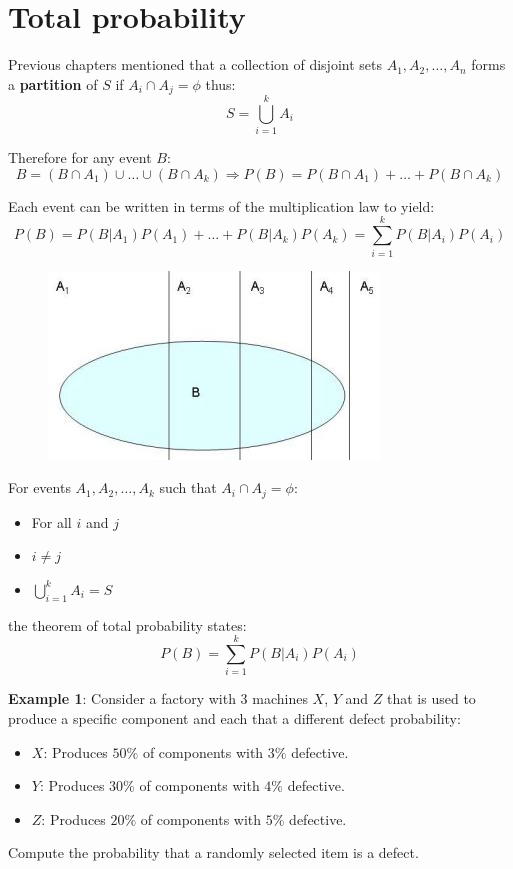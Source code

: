 \documentclass[10pt,a4paper]{article}
\begin{document}
\section{Total probability}

Previous chapters mentioned that a collection of disjoint sets $A_1,A_2,\dots,A_n$ forms a
\textbf{partition} of $S$ if $A_i \cap A_j = \phi$ thus:
$$
    S = \bigcup_{i=1}^k A_i
$$

Therefore for any event $B$:
$$
    B = (B\cap A_1)\cup \dots \cup (B\cap A_k) \Rightarrow P(B)=P(B\cap A_1)+\dots+P(B\cap A_k)
$$

Each event can be written in terms of the multiplication law to yield:
$$
    P(B)=P(B|A_1)P(A_1)+\dots+P(B|A_k)P(A_k) = \sum_{i=1}^k P(B|A_i)P(A_i)
$$

\begin{figure} [h!]
    \centering
    \includegraphics[scale=0.7]{partition.JPG}
\end{figure}

\begin{tcolorbox}[breakable,colback=white]
For events $A_1,A_2,\dots,A_k$ such that $A_i\cap A_j=\phi$:
\begin{itemize}
    \item For all $i$ and $j$
    \item $i \neq j$
    \item $\bigcup_{i=1}^k A_i = S$
\end{itemize} 
the theorem of total probability states:
$$
    P(B)=\sum_{i=1}^k P(B|A_i)P(A_i)
$$
\end{tcolorbox}

\textbf{Example 1}: Consider a factory with 3 machines $X$, $Y$ and $Z$ that is used to produce a
specific component and each that a different defect probability:
\begin{itemize}
    \item $X$: Produces $50\%$ of components with $3\%$ defective.
    \item $Y$: Produces $30\%$ of components with $4\%$ defective. 
    \item $Z$: Produces $20\%$ of components with $5\%$ defective. 
\end{itemize} 
Compute the probability that a randomly selected item is a defect.
\end{document}
